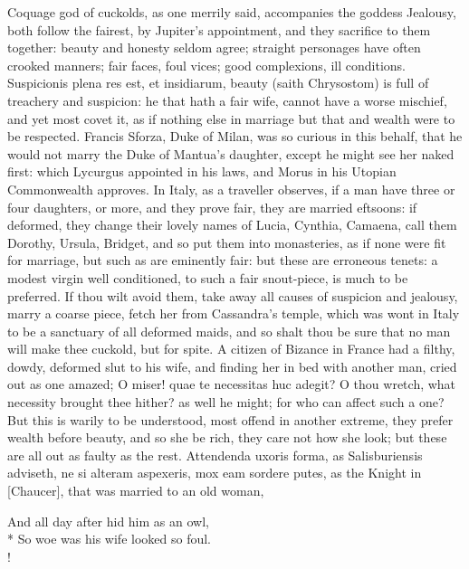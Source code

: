 Coquage god of cuckolds, as one merrily said, accompanies the
goddess Jealousy, both follow the fairest, by Jupiter's appointment,
and they sacrifice to them together: beauty and honesty seldom agree;
straight personages have often crooked manners; fair faces, foul vices;
good complexions, ill conditions. Suspicionis plena res est, et
insidiarum, beauty (saith Chrysostom) is full of treachery and
suspicion: he that hath a fair wife, cannot have a worse mischief, and
yet most covet it, as if nothing else in marriage but that and wealth
were to be respected. Francis Sforza, Duke of Milan, was so
curious in this behalf, that he would not marry the Duke of Mantua's
daughter, except he might see her naked first: which Lycurgus appointed
in his laws, and Morus in his Utopian Commonwealth approves. In
Italy, as a traveller observes, if a man have three or four daughters,
or more, and they prove fair, they are married eftsoons: if deformed,
they change their lovely names of Lucia, Cynthia, Camaena, call them
Dorothy, Ursula, Bridget, and so put them into monasteries, as if none
were fit for marriage, but such as are eminently fair: but these are
erroneous tenets: a modest virgin well conditioned, to such a fair
snout-piece, is much to be preferred. If thou wilt avoid them, take
away all causes of suspicion and jealousy, marry a coarse piece, fetch
her from Cassandra's temple, which was wont in Italy to be a
sanctuary of all deformed maids, and so shalt thou be sure that no man
will make thee cuckold, but for spite. A citizen of Bizance in France
had a filthy, dowdy, deformed slut to his wife, and finding her in bed
with another man, cried out as one amazed; O miser! quae te necessitas
huc adegit? O thou wretch, what necessity brought thee hither? as well
he might; for who can affect such a one? But this is warily to be
understood, most offend in another extreme, they prefer wealth before
beauty, and so she be rich, they care not how she look; but these are
all out as faulty as the rest. Attendenda uxoris forma, as
Salisburiensis adviseth, ne si alteram aspexeris, mox eam sordere
putes, as the Knight in [Chaucer], that was married to an old woman,\label{mention:chaucer-quote-postface}
%
{\gothfont%
\begin{versewithlinenos}{2}{1}{1}%
And all day after hid him as an owl,\\*
So woe was his wife looked so foul.\\!
\end{versewithlinenos}%
}%


